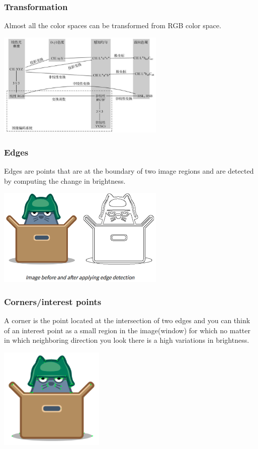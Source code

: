 \documentclass[notheorems,serif,table,compress]{beamer}  %
\begin{document}
\begin{frame}
\frametitle{Transformation}
Almost all the color spaces can be transformed from RGB color space.

\centering\includegraphics[width=8cm]{ColorSpaceTransform}
\end{frame}


\begin{frame}
\frametitle{Edges}
Edges are points that are at the boundary of two image regions and are detected by computing the change in brightness.

\centering\includegraphics[width=8cm]{edge}
\end{frame}


\begin{frame}
\frametitle{Corners/interest points}
A corner is the point located at the intersection of two edges and you can think of an interest point as a small region in the image(window) for which no matter in which neighboring direction you look there is a high variations in brightness.

\centering\includegraphics[width=5cm]{corner}
\end{frame}
\end{document}
